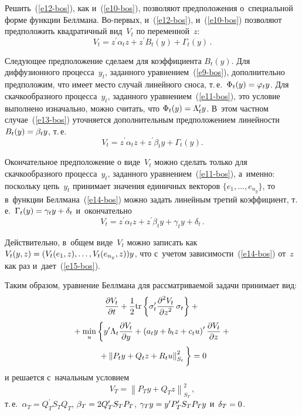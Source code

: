 \begin{multicols}{2}
     Решить~(\ref{e12-bos}), как и~(\ref{e10-bos}), позволяют 
предположения о~специальной форме функции Беллмана. Во-пер\-вых,  
и~(\ref{e12-bos}), и~(\ref{e10-bos}) позволяют предположить квадратичный 
вид~$V_t$ по переменной~$z$:
     \begin{equation}
     V_t= z^\prime \alpha_t z + z^\prime B_t(y) +\Gamma_t(y)\,.
     \label{e13-bos}
     \end{equation}
     
     Следующее предположение сделаем для коэффициента $B_t(y)$. Для 
диффузионного процесса~$y_t$, заданного уравнением~(\ref{e9-bos}), 
дополнительно предположим, что имеет место случай линейного сноса, т.\,е.\ 
$\Phi_t(y)\hm= \varphi_t y$. Для скачкообразного процесса~$y_t$, заданного 
уравнением~(\ref{e11-bos}), это условие выполнено изначально, можно 
считать, что $\Phi_t(y)\hm= \Lambda_t^\prime y$. В~этом частном 
случае~(\ref{e13-bos}) уточняется дополнительным предположением 
линейности $B_t(y)\hm= \beta_t y$, т.\,е.
     \begin{equation}
     V_t= z^\prime \alpha_t z+ z^\prime \beta_t y+ \Gamma_t(y).
     \label{e14-bos}
\end{equation}
     
     Окончательное предположение о виде~$V_t$ можно сделать только для 
скачкообразного процесса~$y_t$, заданного уравнением~(\ref{e11-bos}), 
а~именно: поскольку цепь~$y_t$ принимает значения единичных векторов 
$\{e_1, \ldots , e_{n_y}\}$, то в~функции Беллмана~(\ref{e14-bos}) можно 
задать линейным третий коэффициент, т.\,е.\  $\Gamma_t(y)\hm= \gamma_t  y+\delta_t$ и~окончательно
     \begin{equation}
     V_t= z^\prime\alpha_t z+ z^\prime\beta_t y+ \gamma_t y +\delta_t\,.
     \label{e15-bos}
     \end{equation}
     
     Действительно, в~общем виде~$V_t$ можно записать как $V_t(y,z)\hm= 
(V_t(e_1,z), \ldots , V_t(e_{n_y}, z))y$, что с~учетом  
зависимости~(\ref{e14-bos}) от~$z$ как раз и~дает~(\ref{e15-bos}).
     
     Таким образом, уравнение Беллмана для рассматриваемой задачи 
принимает вид:
     \begin{multline}
     \fr{\partial V_t}{\partial t} +\fr{1}{2}\mathrm{tr}
     \left\{ \sigma_t^\prime \fr{\partial^2 V_t}{\partial 
z^2}\,\sigma_t\right\}+{}\\[2pt]
     {}+
     \min\limits_u\left\{ y^\prime \Lambda_t \fr{\partial V_t}{\partial y} +\left( 
a_t y+b_t z+c_t u\right)^\prime \fr{\partial V_t}{\partial z} +{}\right.\\[2pt]
\left.{}+\left\| P_t y+Q_t z+R_t 
u\right\|^2_{S_t}
\vphantom{\fr{\partial V_t}{\partial y}}\right\}=0
     \label{e16-bos}
\end{multline}
и решается с~начальным условием
\begin{equation*}
V_T= \left\| P_T y+Q_T z\right\|^2_{S_T}\,,
\end{equation*}
т.\,е.\ $\alpha_T=Q_T^\prime S_T Q_T$, $\beta_T\hm= 2Q_T^\prime S_T P_T$, 
$\gamma_T y\hm= y^\prime P_T^\prime S_T P_T y$ и~$\delta_T\hm=0$.
     

\end{multicols}
